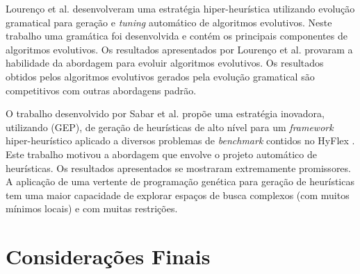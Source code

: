 Lourenço et al. \cite{lourencco2012evolving} desenvolveram uma estratégia hiper-heurística utilizando evolução gramatical para geração e \textit{tuning} automático de algoritmos evolutivos. Neste trabalho uma gramática foi desenvolvida e contém os principais componentes de algoritmos evolutivos. Os resultados apresentados por Lourenço et al. provaram a habilidade da abordagem para evoluir algoritmos evolutivos. Os resultados obtidos pelos algoritmos evolutivos gerados pela evolução gramatical são competitivos com outras abordagens padrão. 


O trabalho desenvolvido por Sabar et al. \cite{sabar2015automatic} propõe uma estratégia inovadora, utilizando  (GEP), de geração de heurísticas de alto nível para um \textit {framework} hiper-heurístico aplicado a diversos problemas de \textit{benchmark} contidos no  HyFlex \cite{ochoa2012hyflex}. Este trabalho motivou a abordagem que envolve o projeto automático de heurísticas. Os resultados apresentados se mostraram extremamente promissores. A aplicação de uma vertente de programação genética para geração de heurísticas tem uma maior capacidade de explorar espaços de busca complexos (com muitos mínimos locais) e com muitas restrições.










\section{Considerações Finais}
\label{TrabalhosRelacionados:Conclusão}

